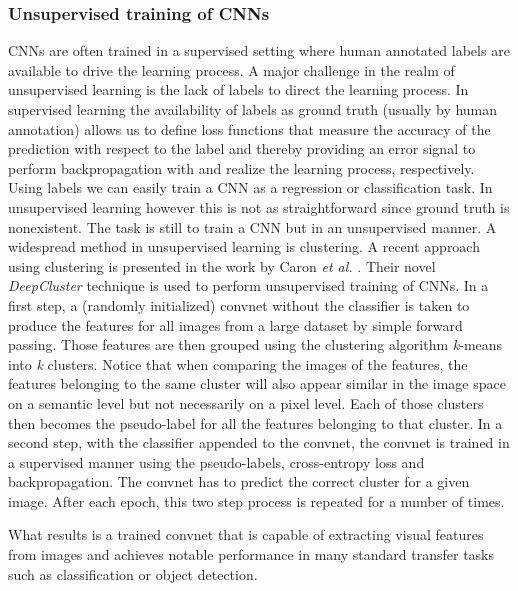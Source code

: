 \documentclass[12pt,a4paper]{article}
\begin{document}
\subsubsection{Unsupervised training of CNNs}\label{subsec:deepcluster}
CNNs are often trained in a supervised setting where human annotated labels are available to drive the learning process. A major challenge in the realm of unsupervised learning is the lack of labels to direct the learning process. In supervised learning the availability of labels as ground truth (usually by human annotation) allows us to define loss functions that measure the accuracy of the prediction with respect to the label and thereby providing an error signal to perform backpropagation with and realize the learning process, respectively. Using labels we can easily train a CNN as a regression or classification task. In unsupervised learning however this is not as straightforward since ground truth is nonexistent. The task is still to train a CNN but in an unsupervised manner. A widespread method in unsupervised learning is clustering. A recent approach using clustering is presented in the work by Caron \textit{et al.} \cite{DeepCluster}. Their novel \textit{DeepCluster} technique is used to perform unsupervised training of CNNs. In a first step, a (randomly initialized) convnet without the classifier is taken to produce the features for all images from a large dataset by simple forward passing. Those features are then grouped using the clustering algorithm \textit{k}-means into \textit{k} clusters. Notice that when comparing the images of the features, the features belonging to the same cluster will also appear similar in the image space on a semantic level but not necessarily on a pixel level. Each of those clusters then becomes the pseudo-label for all the features belonging to that cluster. In a second step, with the classifier appended to the convnet, the convnet is trained in a supervised manner using the pseudo-labels, cross-entropy loss and backpropagation. The convnet has to predict the correct cluster for a given image. After each epoch, this two step process is repeated for a number of times. 
\par What results is a trained convnet that is capable of extracting visual features from images and achieves notable performance in many standard transfer tasks such as classification or object detection.


\end{document}
